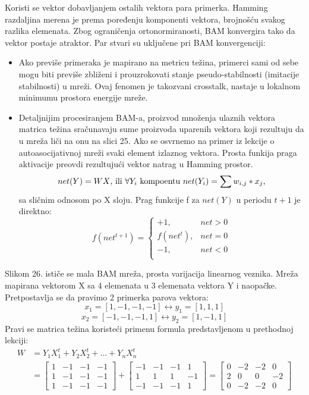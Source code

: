 \documentclass[fontsize=11bp, paper=a4]{scrarticle}
\begin{document}
Koristi se vektor dobavljanjem ostalih vektora para primerka. Hamming razdaljina merena je prema poređenju komponenti vektora, brojnošću svakog razlika elemenata. Zbog ograničenja ortonormiranosti, BAM konvergira tako da vektor postaje atraktor. Par stvari su uključene pri BAM konvergenciji:
\begin{itemize}
    \item Ako previše primeraka je mapirano na metricu težina, primerci sami od sebe mogu biti previše zbliženi i prouzrokovati stanje pseudo-stabilnosti (imitacije stabilnosti) u mreži. Ovaj fenomen je takozvani crosstalk, nastaje u lokalnom minimumu prostora energije mreže.
    \item Detaljnijim procesiranjem BAM-a, proizvod množenja ulaznih vektora matrica težina sračunavaju sume proizvoda uparenih vektora koji rezultuju da u mreža liči na onu na slici 25. Ako se osvrnemo na primer iz lekcije o autoasocijativnoj mreži svaki element izlaznog vektora. Prosta funkija praga aktivacije preovdi rezultujući vektor natrag u Hamming prostor.
    $$
    net(Y) = WX\textnormal{, ili $\forall Y_i$ kompoentu $net (Y_i) = \sum w_{i,j}*x_j$,}
    $$
    sa sličnim odnosom po X sloju. Prag funkcije f za $net(Y)$ u periodu $t+1$ je direktno:
    $$
    f(net^{t+1})= \begin{cases} 
        +1, & net > 0 \\
        f(net^t), & net = 0 \\
        -1, & net < 0 \\
    \end{cases}
    $$
\end{itemize}
Slikom 26. ističe se mala BAM mreža, prosta varijacija linearnog veznika. Mreža mapirana vektorom X sa 4 elemenata u 3 elemenata vektora Y i naopačke. Pretpostavlja se da pravimo 2 primerka parova vektora:
$$x_1 = [1, -1, -1, -1] \leftrightarrow y_1 = [1, 1, 1]$$
$$x_2 = [-1, -1, -1, 1] \leftrightarrow y_2 = [1, -1, 1]$$
Pravi se matrica težina koristeći primenu formula predstavljenom u prethodnoj lekciji:
$$
\begin{aligned}
    W &= Y_1X_1^t + Y_2X_2^t + ... + Y_nX_n^t \\
      &= \begin{bmatrix}
    1 & -1 & -1 & -1 \\
    1 & -1 & -1 & -1 \\
    1 & -1 & -1 & -1 
\end{bmatrix} + \begin{bmatrix}
    -1 & -1 & -1 & 1 \\
    1 & 1 & 1 & -1 \\
    -1 & -1 & -1 & 1 
\end{bmatrix} =
\begin{bmatrix}
    0 & -2 & -2 & 0 \\
    2 & 0 & 0 & -2 \\
    0 & -2 & -2 & 0
\end{bmatrix} \\
\end{aligned}
$$
\end{document}
